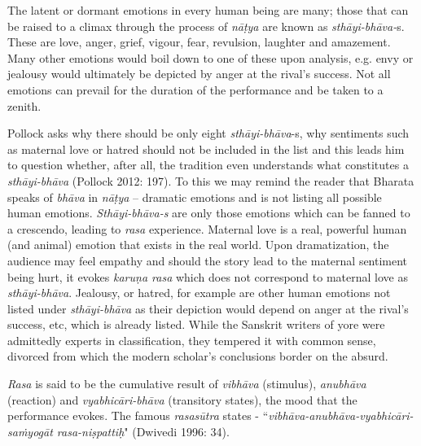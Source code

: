 The latent or dormant emotions in every human being are many; those that can be raised to a climax through the process of \textit{nāṭya} are known as \textit{sthāyi-bhāva-}s. These are love, anger, grief, vigour, fear, revulsion, laughter and amazement. Many other emotions would boil down to one of these upon analysis, e.g. envy or jealousy would ultimately be depicted by anger at the rival’s success. Not all emotions can prevail for the duration of the performance and be taken to a zenith.

Pollock asks why there should be only eight \textit{sthāyi-bhāva}-s, why sentiments such as maternal love or hatred should not be included in the list and this leads him to question whether, after all, the tradition even understands what constitutes a \textit{sthāyi-bhāva }(Pollock 2012: 197). To this we may remind the reader that Bharata speaks of \textit{bhāva} in \textit{nāṭya} – dramatic emotions and is not listing all possible human emotions. \textit{Sthāyi-bhāva-s} are only those emotions which can be fanned to a crescendo, leading to \textit{rasa} experience. Maternal love is a real, powerful human (and animal) emotion that exists in the real world. Upon dramatization, the audience may feel empathy and should the story lead to the maternal sentiment being hurt, it evokes \textit{karuṇa rasa} which does not correspond to maternal love as \textit{sthāyi-bhāva}. Jealousy, or hatred, for example are other human emotions not listed under \textit{sthāyi-bhāva} as their depiction would depend on anger at the rival’s success, etc, which is already listed. While the Sanskrit writers of yore were admittedly experts in classification, they tempered it with common sense, divorced from which the modern scholar’s conclusions border on the absurd.

\textit{Rasa} is said to be the cumulative result of \textit{vibhāva} (stimulus), \textit{anubhāva} (reaction) and \textit{vyabhicāri-bhāva} (transitory states), the mood that the performance evokes. The famous \textit{rasasūtra} states - “\textit{vibhāva-anubhāva-vyabhicāri-saṁyogāt rasa-niṣpattiḥ}" (Dwivedi 1996: 34).

